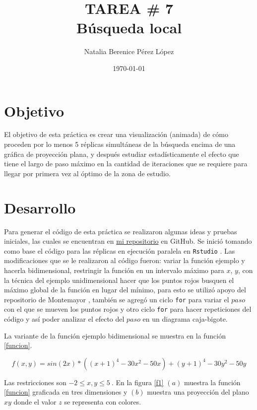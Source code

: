 \documentclass{article}
\title{TAREA \# 7 \\ Búsqueda local} %
\author{Natalia Berenice P\'{e}rez L\'{o}pez} %
\date{\today}
\begin{document}

\maketitle %

\section{Objetivo}
El objetivo de esta práctica es crear una visualización (animada) de cómo proceden por lo menos 5 réplicas simultáneas de la búsqueda encima de una gráfica de proyección plana, y después estudiar estadísticamente el efecto que tiene el largo de paso máximo en la cantidad de iteraciones que se requiere para llegar por primera vez al óptimo de la zona de estudio. 

\section{Desarrollo} %
Para generar el código de esta práctica se realizaron algunas ideas y pruebas iniciales, las cuales se encuentran en \href{https://github.com/nataliaperez0/Simulation/tree/main/Tarea7}{mi repositorio}  en GitHub. Se inició tomando como base el código para las réplicas en ejecución paralela en \texttt{Rstudio} \citep{1}. Las modificaciones que se le realizaron al código fueron: variar la función ejemplo y hacerla bidimensional, restringir la función en un intervalo máximo para $x$, $y$, con la técnica del ejemplo unidimensional hacer que los puntos rojos busquen el máximo global de la función en lugar del mínimo, para esto se utilizó apoyo del repositorio de Montemayor \citep{2}, también se agregó un ciclo \texttt{for} para variar el $paso$ con el que se mueven los puntos rojos y otro ciclo \texttt{for} para hacer repeticiones del código y así poder analizar el efecto del $paso$ en un diagrama caja-bigote.
\bigskip

La variante de la función ejemplo bidimensional se muestra en la función \eqref{funcion}.

\begin{equation}
f(x,y) = sin(2x) * ((x + 1)^4 - 30x^2 -50x) + (y + 1)^4 - 30y^2 - 50y
\label{funcion}
\end{equation}

Las restricciones son $ -2 \leq x, y \leq 5 \ $. En la figura \ref{f1} $(a)$ muestra la función \eqref{funcion} graficada en tres dimensiones y $(b)$ muestra una proyección del plano $xy$ donde el valor $z$ se representa con colores.
\end{document}
